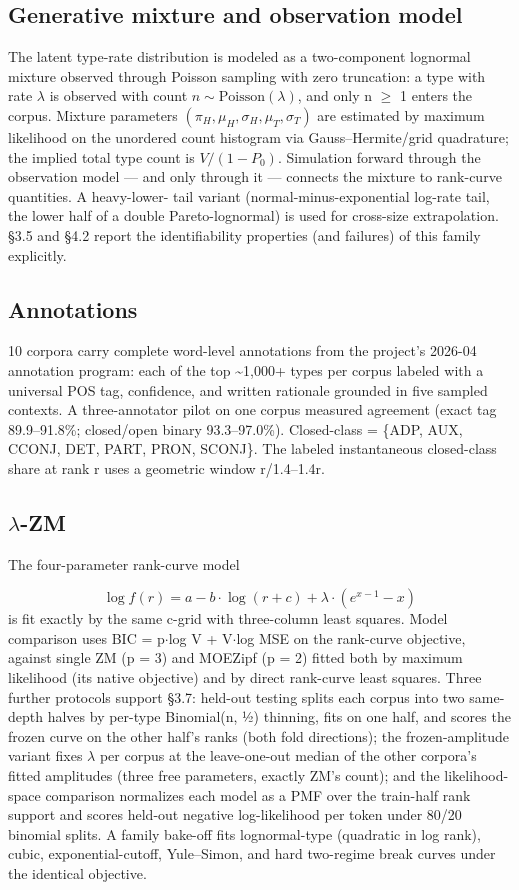 \documentclass[11pt]{article}
\begin{document}
\subsection{Generative mixture and observation model}
The latent type-rate distribution is modeled as a two-component lognormal mixture observed through Poisson sampling with zero truncation: a type with rate $\lambda$ is observed with count $n \sim \mathrm{Poisson}(\lambda)$, and only n $\ge$ 1 enters the corpus. Mixture parameters $(\pi_H,\mu_H,\sigma_H,\mu_T,\sigma_T)$ are estimated by maximum likelihood on the unordered count histogram via Gauss--Hermite/grid quadrature; the implied total type count is $V/(1-P_0)$. Simulation forward through the observation model --- and only through it --- connects the mixture to rank-curve quantities. A heavy-lower- tail variant (normal-minus-exponential log-rate tail, the lower half of a double Pareto-lognormal) is used for cross-size extrapolation. \S3.5 and \S4.2 report the identifiability properties (and failures) of this family explicitly.

\subsection{Annotations}
10 corpora carry complete word-level annotations from the project's 2026-04 annotation program: each of the top \~{}1,000+ types per corpus labeled with a universal POS tag, confidence, and written rationale grounded in five sampled contexts. A three-annotator pilot on one corpus measured agreement (exact tag 89.9--91.8\%; closed/open binary 93.3--97.0\%). Closed-class = \{ADP, AUX, CCONJ, DET, PART, PRON, SCONJ\}. The labeled instantaneous closed-class share at rank r uses a geometric window r/1.4--1.4r.

\subsection{$\lambda$-ZM}
The four-parameter rank-curve model

\begin{equation}\log  f(r) = a - b\cdot \log (r + c) + \lambda \cdot (e^{x-1} - x)\end{equation}
is fit exactly by the same c-grid with three-column least squares. Model comparison uses BIC = p$\cdot$log V + V$\cdot$log MSE on the rank-curve objective, against single ZM (p = 3) and MOEZipf (p = 2) fitted both by maximum likelihood (its native objective) and by direct rank-curve least squares. Three further protocols support \S3.7: held-out testing splits each corpus into two same-depth halves by per-type Binomial(n, ½) thinning, fits on one half, and scores the frozen curve on the other half's ranks (both fold directions); the frozen-amplitude variant fixes $\lambda$ per corpus at the leave-one-out median of the other corpora's fitted amplitudes (three free parameters, exactly ZM's count); and the likelihood-space comparison normalizes each model as a PMF over the train-half rank support and scores held-out negative log-likelihood per token under 80/20 binomial splits. A family bake-off fits lognormal-type (quadratic in log rank), cubic, exponential-cutoff, Yule--Simon, and hard two-regime break curves under the identical objective.
\end{document}
